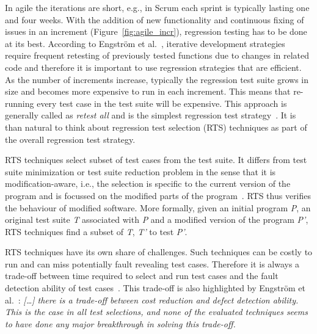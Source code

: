 \documentclass[11pt, oneside]{article}   	%
\begin{document}
In agile the iterations are short, e.g., in Scrum each sprint is typically lasting one and four weeks. With the addition of new functionality and continuous fixing of issues in an increment (Figure~\ref{fig:agile_incr}), regression testing has to be done at its best. According to Engstr\"{o}m et al.~\cite{Emelie10}, iterative development strategies require frequent retesting of previously tested functions due to changes in related code and therefore it is important to use regression strategies that are efficient. As the number of increments increase, typically the regression test suite grows in size and becomes more expensive to run in each increment. This means that re-running every test case in the test suite will be expensive. This approach is generally called as \textit{retest all} and is the simplest regression test strategy~\cite{Graves01}. It is than natural to think about regression test selection (RTS) techniques as part of the overall regression test strategy. 

RTS techniques select subset of test cases from the test suite. It differs from test suite minimization or test suite reduction problem in the sense that it is modification-aware, i.e., the selection is specific to the current version of the program and is focussed on the modified parts of the program~\cite{Yoo12}. RTS thus verifies the behaviour of modified software. More formally, given an initial program \textit{P}, an original test suite \textit{T} associated with \textit{P} and a modified version of the program \textit{P'}, RTS techniques find a subset of \textit{T}, \textit{T'} to test \textit{P'}. 

RTS techniques have its own share of challenges. Such techniques can be costly to run and can miss potentially fault revealing test cases. Therefore it is always a trade-off between time required to select and run test cases and the fault detection ability of test cases~\cite{Graves01}. This trade-off is also highlighted by Engstr\"{o}m et al.~\cite{Emelie10}: \textit{[\ldots] there is a trade-off between cost reduction and defect detection ability. This is the case in all test selections, and none of the evaluated techniques seems to have done any major breakthrough in solving this trade-off.}
\end{document}
